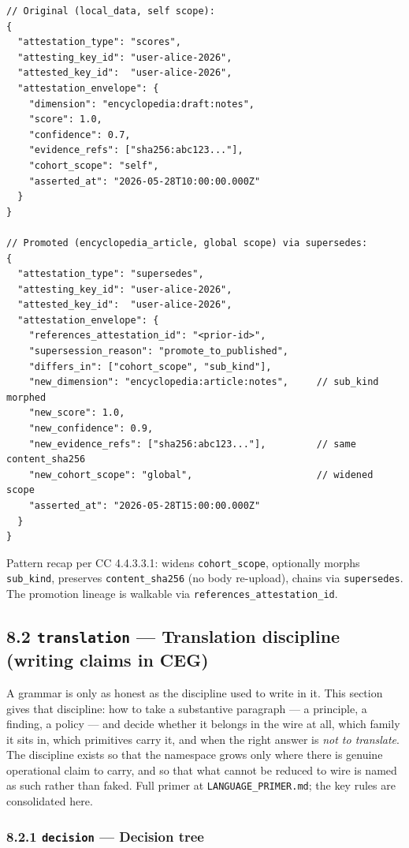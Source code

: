 \documentclass[11pt]{article}
\begin{document}
\begin{lstlisting}
// Original (local_data, self scope):
{
  "attestation_type": "scores",
  "attesting_key_id": "user-alice-2026",
  "attested_key_id":  "user-alice-2026",
  "attestation_envelope": {
    "dimension": "encyclopedia:draft:notes",
    "score": 1.0,
    "confidence": 0.7,
    "evidence_refs": ["sha256:abc123..."],
    "cohort_scope": "self",
    "asserted_at": "2026-05-28T10:00:00.000Z"
  }
}

// Promoted (encyclopedia_article, global scope) via supersedes:
{
  "attestation_type": "supersedes",
  "attesting_key_id": "user-alice-2026",
  "attested_key_id":  "user-alice-2026",
  "attestation_envelope": {
    "references_attestation_id": "<prior-id>",
    "supersession_reason": "promote_to_published",
    "differs_in": ["cohort_scope", "sub_kind"],
    "new_dimension": "encyclopedia:article:notes",     // sub_kind morphed
    "new_score": 1.0,
    "new_confidence": 0.9,
    "new_evidence_refs": ["sha256:abc123..."],         // same content_sha256
    "new_cohort_scope": "global",                      // widened scope
    "asserted_at": "2026-05-28T15:00:00.000Z"
  }
}
\end{lstlisting}

Pattern recap per CC 4.4.3.3.1: widens \texttt{cohort\_scope}, optionally morphs \texttt{sub\_kind}, preserves \texttt{content\_sha256} (no body re-upload), chains via \texttt{supersedes}. The promotion lineage is walkable via \texttt{references\_attestation\_id}.


\subsection*{8.2 \texttt{translation} — Translation discipline (writing claims in CEG)}


A grammar is only as honest as the discipline used to write in it. This section gives that discipline: how to take a substantive paragraph — a principle, a finding, a policy — and decide whether it belongs in the wire at all, which family it sits in, which primitives carry it, and when the right answer is \textit{not to translate}. The discipline exists so that the namespace grows only where there is genuine operational claim to carry, and so that what cannot be reduced to wire is named as such rather than faked. Full primer at \texttt{LANGUAGE\_PRIMER.md}; the key rules are consolidated here.


\subsubsection*{8.2.1 \texttt{decision} — Decision tree}
\end{document}
